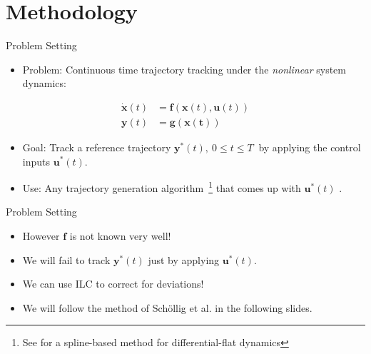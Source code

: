 \documentclass{beamer}
\newcommand{\state}{\mathbf{x}} %
\newcommand{\traj}{\mathbf{y}^{*}} %
\newcommand{\sysInput}{\mathbf{u}} %
\newcommand{\observations}{\mathbf{y}} %
\begin{document}
\section{Methodology}
%
\begin{frame}{Problem Setting}
\begin{itemize}
\item Problem: Continuous time trajectory tracking under the \emph{nonlinear} system dynamics: \pause
\end{itemize}
\begin{equation*}
\begin{aligned}
\dot{\state}(t) &= \mathbf{f}(\state(t),\sysInput(t)) \\
\observations(t) &= \mathbf{g(x(t))} 
\end{aligned}
\end{equation*}
\begin{itemize}
\item Goal: Track a reference trajectory $\traj(t), \ 0 \leq t \leq T \ $ by applying the control inputs $\sysInput^{*}(t)$. \pause
\item Use: Any trajectory generation algorithm~\footnote{See \cite{Zhang} for a spline-based method for differential-flat dynamics} that comes up with $\sysInput^{*}(t)$ %
.\pause 
\end{itemize}
\end{frame}
%
\begin{frame}{Problem Setting}
\begin{itemize}	
\item However $\mathbf{f}$ is not known very well! \pause
\item We will fail to track $\traj(t)$ just by applying $\sysInput^{*}(t)$. \pause
\item We can use ILC to correct for deviations! \pause
\item We will follow the method of Sch\"{o}llig et al. \cite{ILC_Angela} in the following slides. 
\end{itemize}
\end{frame}
%
\end{document}
